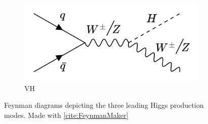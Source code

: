 \begin{figure}[htp]
     \hfill 
     \\
        \begin{subfigure}[b]{0.3\textwidth}
         \centering
         \includegraphics[width=\textwidth]{figures/theory_chapter/VH.png}
         \caption{VH}
         \label{fig:VH}
     \end{subfigure}
  \label{fig:Higgsmodes}
  \caption{Feynman diagrams depicting the three leading Higgs production modes. Made with \ref{cite:FeynmanMaker}}  
\end{figure}

